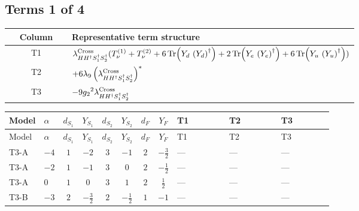 \documentclass[8pt]{article}
\begin{document}
\begin{landscape}
\subsection*{Terms 1 of 4}
\begin{center}
\begin{tabular}{@{}c >{\raggedright\arraybackslash}p{0.82\linewidth}@{}}
\toprule
Column & Representative term structure \\
\midrule
T1 & \(\displaystyle {\lambda_{H H^\dagger S_1^\dagger S_2^\dagger}^{\rm Cross}} (T_{\nu}^{(1)}+T_{\nu}^{(2)}+6 \operatorname{Tr}\!\left({Y_d}\,\left({Y_d}\right)^{\dagger}\right)+2 \operatorname{Tr}\!\left({Y_e}\,\left({Y_e}\right)^{\dagger}\right)+6 \operatorname{Tr}\!\left({Y_u}\,\left({Y_u}\right)^{\dagger}\right))\) \\
\midrule
T2 & \(\displaystyle +6 {\lambda_{9}} \left({\lambda_{H H^\dagger S_1^\dagger S_2^\dagger}^{\rm Cross}}\right)^{*}\) \\
\midrule
T3 & \(\displaystyle -9 {g_2}^2 {\lambda_{H H^\dagger S_1^\dagger S_2^\dagger}^{\rm Cross}}\) \\
\midrule
\bottomrule
\end{tabular}
\end{center}
\smallskip
\tiny
\begin{longtable}{@{}llcccccc >{\raggedright\arraybackslash}p{0.21\linewidth} >{\raggedright\arraybackslash}p{0.21\linewidth} >{\raggedright\arraybackslash}p{0.21\linewidth}@{}}
\toprule
Model & $\alpha$ & $d_{S_1}$ & $Y_{S_1}$ & $d_{S_2}$ & $Y_{S_2}$ & $d_F$ & $Y_F$ & T1 & T2 & T3 \\
\midrule
\endfirsthead
\toprule
Model & $\alpha$ & $d_{S_1}$ & $Y_{S_1}$ & $d_{S_2}$ & $Y_{S_2}$ & $d_F$ & $Y_F$ & T1 & T2 & T3 \\
\midrule
\endhead
T3-A & $-4$ & $1$ & $-2$ & $3$ & $-1$ & $2$ & $-\frac{3}{2}$ & --- & --- & --- \\
\midrule
T3-A & $-2$ & $1$ & $-1$ & $3$ & $0$ & $2$ & $-\frac{1}{2}$ & --- & --- & --- \\
\midrule
T3-A & $0$ & $1$ & $0$ & $3$ & $1$ & $2$ & $\frac{1}{2}$ & --- & --- & --- \\
\midrule
T3-B & $-3$ & $2$ & $-\frac{3}{2}$ & $2$ & $-\frac{1}{2}$ & $1$ & $-1$ & --- & --- & --- \\
\midrule

\end{longtable}
\end{landscape}
\end{document}
